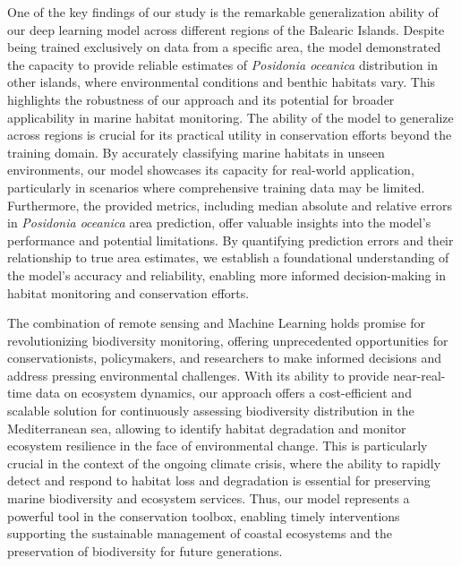 One of the key findings of our study is the remarkable generalization ability
of our deep learning model across different regions of the Balearic Islands.
Despite being trained exclusively on data from a specific area, the model
demonstrated the capacity to provide reliable estimates of \textit{Posidonia
    oceanica} distribution in other islands, where environmental conditions and
benthic habitats vary. This highlights the robustness of our approach and its
potential for broader applicability in marine habitat monitoring. The ability
of the model to generalize across regions is crucial for its practical utility
in conservation efforts beyond the training domain. By accurately classifying
marine habitats in unseen environments, our model showcases its capacity for
real-world application, particularly in scenarios where comprehensive training
data may be limited. Furthermore, the provided metrics, including median
absolute and relative errors in \textit{Posidonia
    oceanica} area prediction, offer valuable insights into the model's
performance and potential limitations. By quantifying prediction errors and
their relationship to true area estimates, we establish a foundational
understanding of the model's accuracy and reliability, enabling more informed
decision-making in habitat monitoring and conservation efforts.

The combination of remote sensing and Machine Learning holds promise for
revolutionizing biodiversity monitoring, offering unprecedented opportunities
for conservationists, policymakers, and researchers to make informed decisions
and address pressing environmental challenges. With its ability to provide
near-real-time data on ecosystem dynamics, our approach offers a cost-efficient
and scalable solution for continuously assessing biodiversity distribution in
the Mediterranean sea, allowing to identify habitat degradation and monitor
ecosystem resilience in the face of environmental change. This is particularly
crucial in the context of the ongoing climate crisis, where the ability to
rapidly detect and respond to habitat loss and degradation is essential for
preserving marine biodiversity and ecosystem services. Thus, our model
represents a powerful tool in the conservation toolbox, enabling timely
interventions supporting the sustainable management of coastal ecosystems and
the preservation of biodiversity for future generations.

